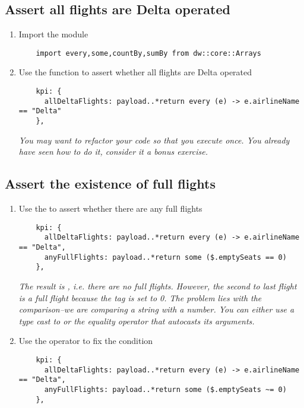 \subsection{Assert all flights are Delta operated}
\begin{enumerate}[resume*]
\item Import the  module
  \begin{lstlisting}
    import every,some,countBy,sumBy from dw::core::Arrays
  \end{lstlisting}
\item Use the  function to assert whether all flights are Delta operated
  \begin{lstlisting}
    kpi: {
      allDeltaFlights: payload..*return every (e) -> e.airlineName == "Delta"
    },
  \end{lstlisting}
  \emph{
    You may want to refactor your code so that you execute  once.  You already have seen how to do it, consider it a bonus exercise.
  }
\end{enumerate}

\subsection{Assert the existence of full flights}
\begin{enumerate}[resume*]
\item Use the  to assert whether there are any full flights
  \begin{lstlisting}
    kpi: {
      allDeltaFlights: payload..*return every (e) -> e.airlineName == "Delta",
      anyFullFlights: payload..*return some ($.emptySeats == 0)
    },
  \end{lstlisting}
  \emph{
    The result is , i.e. there are no full flights.  However, the second to last flight is a full flight because the  tag is set to 0.  The problem lies with the comparison--we are comparing a string with a number.  You can either use a type cast to  or the equality operator \ttt{\textasciitilde=} that autocasts its arguments.
  }
\item Use the operator \ttt{\textasciitilde=} to fix the  condition
  \begin{lstlisting}
    kpi: {
      allDeltaFlights: payload..*return every (e) -> e.airlineName == "Delta",
      anyFullFlights: payload..*return some ($.emptySeats ~= 0)
    },
  \end{lstlisting}
\end{enumerate}

